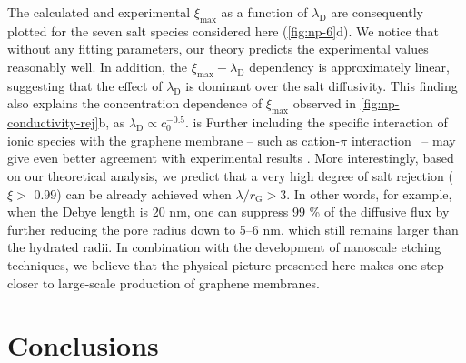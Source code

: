 %
The calculated and
experimental $\xi_{\mathrm{max}}$ as a function of
$\lambda_{\mathrm{D}}$ are consequently plotted for the seven salt
species considered here (\autoref{fig:np-6}d).  
We notice that
without any fitting parameters, our theory predicts the
experimental values reasonably well.
%
In addition, the $\xi_{\mathrm{max}}-\lambda_{\mathrm{D}}$ dependency
is approximately linear, suggesting that the effect of
$\lambda_{\mathrm{D}}$ is dominant over the salt diffusivity.
%
This
finding also explains the concentration dependence of
$\xi_{\mathrm{max}}$ observed in \autoref{fig:np-conductivity-rej}b, as
$\lambda_{\mathrm{D}} \propto c_{0}^{-0.5}$.
%
is %
Further including
the specific interaction of ionic species with the graphene membrane
-- such as cation-$\pi$ interaction~\cite{Shi_2013_ion_enrichment} --
may give even better agreement with experimental results
\cite{Ghosh_2018_PG_ion}.
%
More interestingly, based on our theoretical
analysis, we predict that a very high degree of salt rejection ($\xi>$
0.99) can be already achieved when $\lambda / r_{\mathrm{G}}>$3.
%
In
other words, for example, when the Debye length is 20 nm, one can
suppress 99 \% of the diffusive flux by further reducing the pore
radius down to 5--6 nm, which still remains larger than the
hydrated radii.
%
In combination with the development of nanoscale
etching techniques, we believe that the physical picture presented
here makes one step closer to large-scale production of graphene
membranes.

\section{Conclusions}
\label{sec:np-conclusions}

